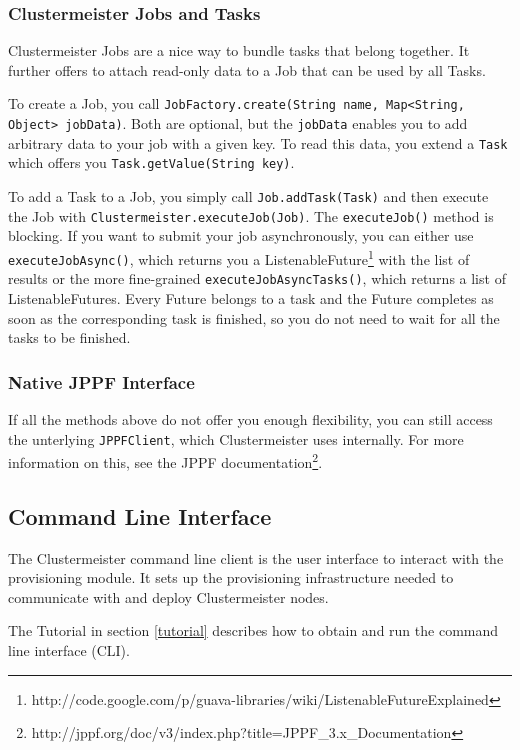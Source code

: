 \documentclass{article}
\begin{document}
\subsubsection{Clustermeister Jobs and Tasks}

Clustermeister Jobs are a nice way to bundle tasks that belong together. It further offers to attach read-only data to a Job that can be used by all Tasks.

To create a Job, you call \texttt{JobFactory.create(String name, Map<String, Object> jobData)}. Both are optional, but the \texttt{jobData} enables you to add arbitrary data to your job with a given key. To read this data, you extend a \texttt{Task} which offers you \texttt{Task.getValue(String key)}.

To add a Task to a Job, you simply call \texttt{Job.addTask(Task)} and then execute the Job with \texttt{Clustermeister.executeJob(Job)}. The \texttt{executeJob()} method is blocking. If you want to submit your job asynchronously, you can either use \texttt{executeJobAsync()}, which returns you a ListenableFuture\footnote{http://code.google.com/p/guava-libraries/wiki/ListenableFutureExplained} with the list of results or the more fine-grained \texttt{executeJobAsyncTasks()}, which returns a list of ListenableFutures. Every Future belongs to a task and the Future completes as soon as the corresponding task is finished, so you do not need to wait for all the tasks to be finished.

\subsubsection{Native JPPF Interface}

If all the methods above do not offer you enough flexibility, you can still access the unterlying \texttt{JPPFClient}, which Clustermeister uses internally. For more information on this, see the JPPF documentation\footnote{http://jppf.org/doc/v3/index.php?title=JPPF\_3.x\_Documentation}.

\subsection{Command Line Interface}

The Clustermeister command line client is the user interface to interact with the provisioning module. It sets up the provisioning infrastructure needed to communicate with and deploy Clustermeister nodes.

The Tutorial in section \ref{tutorial} describes how to obtain and run the command line interface (CLI).
\end{document}
